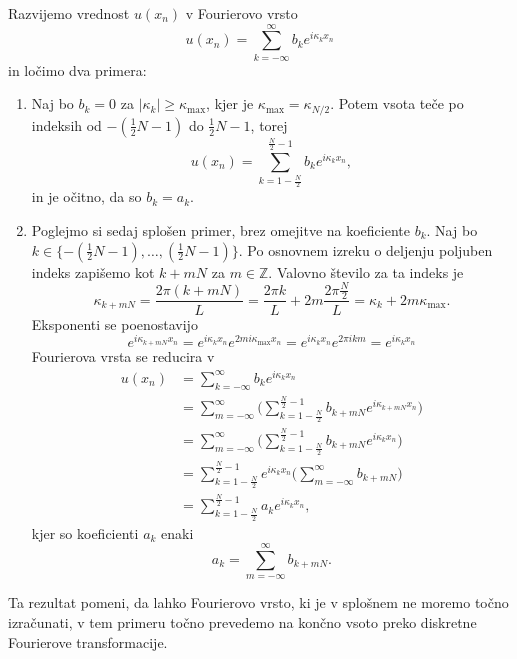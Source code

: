 \documentclass[mat2, tisk]{fmfdelo}
\newcommand{\Z}{\mathbb Z}
\begin{document}
\begin{dokaz}
Razvijemo vrednost $u(x_n)$ v Fourierovo vrsto 
$$
u(x_n) = \sum_{k=-\infty}^{\infty} b_k e^{i\kappa_k x_n}
$$
in ločimo dva primera: \\
\begin{enumerate}
  \item[i)] Naj bo $b_k = 0$ za $|\kappa_k| \geq \kappa_{\text{max}}$, kjer je 
  $\kappa_{\text{max}} = \kappa_{N/2}$. Potem vsota teče po indeksih od 
  $-(\frac{1}{2}N - 1)$ do $\frac{1}{2}N - 1$, torej
  $$
  u(x_n) = \sum_{k=1-\frac{N}{2}}^{\frac{N}{2}-1} b_k e^{i\kappa_k x_n},
  $$
  in je očitno, da so $b_k = a_k$. 
  \item[ii)] Poglejmo si sedaj splošen primer, brez omejitve na koeficiente 
  $b_k$. Naj bo $k \in \{-(\frac{1}{2}N - 1), \dots, (\frac{1}{2}N - 1)\}$. 
  Po osnovnem izreku o deljenju poljuben indeks zapišemo kot
  $k + mN$ za $m\in \Z$. Valovno število za ta indeks je 
  $$
  \kappa_{k + mN} = \frac{2\pi (k + mN)}{L} = \frac{2\pi k}{L} + 2m\frac{2\pi \frac{N}{2}}{L} = \kappa_k + 2m \kappa_{\text{max}}.
  $$
  Eksponenti se poenostavijo 
  $$
  e^{i \kappa_{k + mN} x_n} =  e^{i \kappa_{k} x_n}  e^{2mi\kappa_{\text{max}} x_n} = 
  e^{i\kappa_k x_n} e^{2\pi i k m} = e^{i\kappa_k x_n}
  $$
  Fourierova vrsta se reducira v 
  \begin{align*}
  u(x_n) &= \sum_{k=-\infty}^{\infty} b_k e^{i\kappa_k x_n} \\
         &= \sum_{m=-\infty}^{\infty} \Big(\sum_{k=1-\frac{N}{2}}^{\frac{N}{2}-1} b_{k+mN} e^{i\kappa_{k+mN} x_n}\Big)\\ 
         &= \sum_{m=-\infty}^{\infty} \Big(\sum_{k=1-\frac{N}{2}}^{\frac{N}{2}-1} b_{k+mN} e^{i\kappa_{k} x_n}\Big)\\ 
         &= \sum_{k=1-\frac{N}{2}}^{\frac{N}{2}-1} e^{i\kappa_{k} x_n}\Big(\sum_{m=-\infty}^{\infty} b_{k+mN}\Big)\\
         &= \sum_{k=1-\frac{N}{2}}^{\frac{N}{2}-1} a_k e^{i\kappa_{k} x_n},
\end{align*}
kjer so koeficienti $a_k$ enaki 
$$a_k = \sum_{m=-\infty}^{\infty} b_{k+mN}.$$
\end{enumerate}
\end{dokaz}

Ta rezultat pomeni, da lahko Fourierovo vrsto, ki je v splošnem ne moremo 
točno izračunati, v tem primeru točno prevedemo na končno vsoto preko 
diskretne Fourierove transformacije. \\
\end{document}
